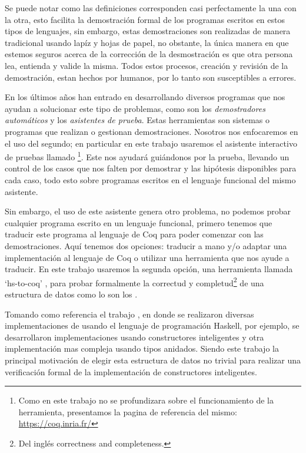 Se puede notar como las definiciones corresponden casi perfectamente la una con la otra,
esto facilita la demostraci\'on formal de los programas escritos en estos tipos de lenguajes, sin
embargo, estas demostraciones son realizadas de manera tradicional usando lap\'iz y hojas de papel,
no obstante, la \'unica manera en que estemos seguros acerca de la correcci\'on de la desmostraci\'on es
que otra persona lea, entienda y valide la misma. Todos estos procesos, creaci\'on y revisi\'on de la
demostraci\'on, estan hechos por humanos, por lo tanto son susceptibles a errores.

En los últimos años han entrado en desarrollando diversos programas que nos ayudan a solucionar
este tipo de problemas, como son los \textit{demostradores autom\'aticos} y los \textit{asistentes de
prueba}. Estas herramientas son sistemas o programas que realizan o gestionan demostraciones. Nosotros
nos enfocaremos en el uso del segundo; en particular en este trabajo usaremos el
asistente interactivo de pruebas llamado {\coq}\footnote{Como en este trabajo no se profundizara sobre el funcionamiento de la herramienta, presentamos la pagina de referencia del mismo: \url{https://coq.inria.fr/}}. Este nos ayudar\'a gui\'andonos por la prueba, llevando un
control de los casos que nos falten por demostrar y las hip\'otesis disponibles para cada caso,
todo esto sobre programas escritos en el lenguaje funcional del mismo asistente.

Sin embargo, el uso de este asistente genera otro problema, no podemos probar cualquier programa
escrito en un lenguaje funcional, primero tenemos que traducir este programa al lenguaje de Coq
para poder comenzar con las demostraciones. Aquí tenemos dos opciones: traducir a mano y/o adaptar una implementación al lenguaje de Coq o utilizar
una herramienta que nos ayude a traducir. En este trabajo usaremos la segunda opci\'on, una
herramienta llamada `hs-to-coq' \cite{thrc}, para probar formalmente la
correctud y completud\footnote{Del ingl\'es correctness and completeness.} de una estructura de datos como lo son los {\arns}.

Tomando como referencia el trabajo \cite{tesisG}, en donde se realizaron diversas implementaciones de {\arns} usando el
lenguaje de programaci\'on Haskell, por ejemplo, se desarrollaron implementaciones usando constructores inteligentes y otra
implementaci\'on mas compleja usando tipos anidados. Siendo este trabajo la principal motivaci\'on
de elegir esta estructura de datos no trivial para realizar una verificaci\'on formal de la implementaci\'on de constructores inteligentes.

